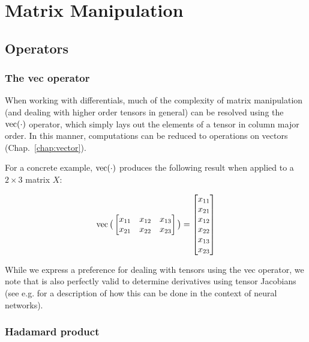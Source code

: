 \appendix
\chapter{Matrix Manipulation} \label{app:matrices}

\section{Operators}

\subsection{The vec operator}

When working with differentials, much of the complexity of matrix manipulation (and dealing with higher order tensors in general) can be resolved using the $\operatorname{vec}(\cdot)$ operator, which simply lays out the elements of a tensor in column major order.  In this manner, computations can be reduced to operations on vectors (Chap.~\ref{chap:vector}). 

For a concrete example, $\operatorname{vec}(\cdot)$ produces the following result when applied to a $2 \times 3$ matrix $X$:

\begin{align}
\operatorname{vec} \big(
\begin{bmatrix}
  x_{11} & x_{12} & x_{13} \\
  x_{21} & x_{22} & x_{23}
\end{bmatrix}
\big)
= 
\begin{bmatrix}
  x_{11} \\
  x_{21} \\
  x_{12} \\
  x_{22} \\
  x_{13} \\
  x_{23} \\
\end{bmatrix}
\end{align}

While we express a preference for dealing with tensors using the vec operator, we note that is also perfectly valid to determine derivatives using tensor Jacobians (see e.g. \cite{johnson2017derivatives} for a description of how this can be done in the context of neural networks).

\subsection{Hadamard product}

